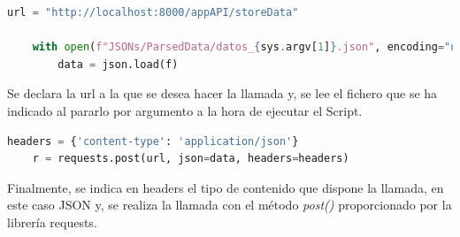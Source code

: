 \begin{lstlisting}[language=Python, caption={Declaración variables data\_post.py}]
	url = "http://localhost:8000/appAPI/storeData"
	
	with open(f"JSONs/ParsedData/datos_{sys.argv[1]}.json", encoding="utf-8") as f:
		data = json.load(f)
\end{lstlisting}

Se declara la url a la que se desea hacer la llamada y, se lee el fichero que se ha indicado al pararlo por argumento a la hora de ejecutar el Script.

\begin{lstlisting}[language=Python, caption={Llamada POST}]
	headers = {'content-type': 'application/json'}
	r = requests.post(url, json=data, headers=headers)
\end{lstlisting}

Finalmente, se indica en headers el tipo de contenido que dispone la llamada, en este caso JSON y, se realiza la llamada con el método \textit{post()} proporcionado por la librería requests.